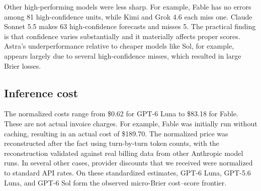 \documentclass[11pt]{article}
\begin{document}
Other high-performing models were less sharp. For example, Fable has no errors among 81 high-confidence units, while Kimi and Grok 4.6 each miss one. Claude Sonnet 5.5 makes 63 high-confidence forecasts and misses 5. The practical finding is that confidence varies substantially and it materially affects proper scores. Astra's underperformance relative to cheaper models like Sol, for example, appears largely due to several high-confidence misses, which resulted in large Brier losses.

\subsection{Inference cost}
The normalized costs range from \$0.62 for GPT-6 Luna to \$83.18 for Fable. These are not actual invoice charges. For example, Fable was initially run without caching, resulting in an actual cost of \$189.70. The normalized price was reconstructed after the fact using turn-by-turn token counts, with the reconstruction validated against real billing data from other Anthropic model runs. In several other cases, provider discounts that we received were normalized to standard API rates. On these standardized estimates, GPT-6 Luna, GPT-5.6 Luna, and GPT-6 Sol form the observed micro-Brier cost--score frontier.
\end{document}
